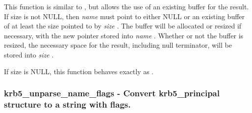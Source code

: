 \documentclass[letterpaper,10pt,english]{sphinxmanual}
\begin{document}
This function is similar to {\hyperref[appdev/refs/api/krb5_unparse_name:c.krb5_unparse_name]{}} , but allows the use of an existing buffer for the result. If size is not NULL, then \emph{name} must point to either NULL or an existing buffer of at least the size pointed to by \emph{size} . The buffer will be allocated or resized if necessary, with the new pointer stored into \emph{name} . Whether or not the buffer is resized, the necessary space for the result, including null terminator, will be stored into \emph{size} .

If size is NULL, this function behaves exactly as {\hyperref[appdev/refs/api/krb5_unparse_name:c.krb5_unparse_name]{}} .


\subsubsection{krb5\_unparse\_name\_flags -  Convert krb5\_principal structure to a string with flags.}
\label{appdev/refs/api/krb5_unparse_name_flags::doc}\label{appdev/refs/api/krb5_unparse_name_flags:krb5-unparse-name-flags-convert-krb5-principal-structure-to-a-string-with-flags}

\begin{fulllineitems}
\label{appdev/refs/api/krb5_unparse_name_flags:c.krb5_unparse_name_flags}
\end{fulllineitems}
\end{document}

